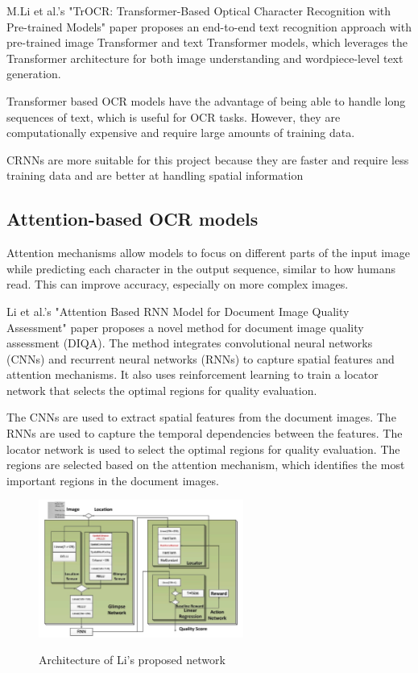 M.Li et al.'s "TrOCR: Transformer-Based Optical Character Recognition with Pre-trained Models" paper proposes an end-to-end text recognition approach with pre-trained image Transformer and text Transformer models, which leverages the Transformer architecture for both image understanding and wordpiece-level text generation. \cite{liTrOCRTransformerBasedOptical2023}

Transformer based OCR models have the advantage of being able to handle long sequences of text, which is useful for OCR tasks. However, they are computationally expensive and require large amounts of training data.

CRNNs are more suitable for this project because they are faster and require less training data and are better at handling spatial information

\newpage

\subsection{Attention-based OCR models}

Attention mechanisms allow models to focus on different parts of the input image while predicting each character in the output sequence, similar to how humans read. This can improve accuracy, especially on more complex images.

Li et al.'s "Attention Based RNN Model for Document Image Quality Assessment" paper proposes a novel method for document image quality assessment (DIQA). The method integrates convolutional neural networks (CNNs) and recurrent neural networks (RNNs) to capture spatial features and attention mechanisms. It also uses reinforcement learning to train a locator network that selects the optimal regions for quality evaluation.

The CNNs are used to extract spatial features from the document images. The RNNs are used to capture the temporal dependencies between the features. The locator network is used to select the optimal regions for quality evaluation. The regions are selected based on the attention mechanism, which identifies the most important regions in the document images. \cite{liAttentionBasedRNN2017}


\begin{figure}[ht]
    \centering
    \includegraphics[width=0.6\textwidth]{Figures/AT_Li.jpg}
    \caption[Architecture of Li's proposed network]{Architecture of Li's proposed network}\cite{liAttentionBasedRNN2017}
    \label{fig:Li's Proposed Architecture}
\end{figure}

